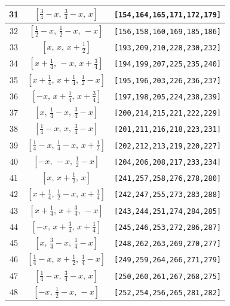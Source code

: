 \documentclass[fleqn,8pt]{jsarticle}
\begin{document}
\begin{longtable}{ccc}
31 & $\left[ \frac{3}{4} - x,\, \frac{3}{4} - x,\, x \right]$ & {\tt [154,164,165,171,172,179]} \\ \hline
32 & $\left[ \frac{1}{2} - x,\, \frac{1}{2} - x,\, - x \right]$ & {\tt [156,158,160,169,185,186]} \\ \hline
33 & $\left[ x,\, x,\, x + \frac{1}{2} \right]$ & {\tt [193,209,210,228,230,232]} \\ \hline
34 & $\left[ x + \frac{1}{4},\, - x,\, x + \frac{3}{4} \right]$ & {\tt [194,199,207,225,235,240]} \\ \hline
35 & $\left[ x + \frac{1}{4},\, x + \frac{1}{4},\, \frac{1}{2} - x \right]$ & {\tt [195,196,203,226,236,237]} \\ \hline
36 & $\left[ - x,\, x + \frac{1}{4},\, x + \frac{3}{4} \right]$ & {\tt [197,198,205,224,238,239]} \\ \hline
37 & $\left[ x,\, \frac{1}{4} - x,\, \frac{3}{4} - x \right]$ & {\tt [200,214,215,221,222,229]} \\ \hline
38 & $\left[ \frac{1}{4} - x,\, x,\, \frac{3}{4} - x \right]$ & {\tt [201,211,216,218,223,231]} \\ \hline
39 & $\left[ \frac{1}{4} - x,\, \frac{1}{4} - x,\, x + \frac{1}{2} \right]$ & {\tt [202,212,213,219,220,227]} \\ \hline
40 & $\left[ - x,\, - x,\, \frac{1}{2} - x \right]$ & {\tt [204,206,208,217,233,234]} \\ \hline
41 & $\left[ x,\, x + \frac{1}{2},\, x \right]$ & {\tt [241,257,258,276,278,280]} \\ \hline
42 & $\left[ x + \frac{1}{4},\, \frac{1}{2} - x,\, x + \frac{1}{4} \right]$ & {\tt [242,247,255,273,283,288]} \\ \hline
43 & $\left[ x + \frac{1}{4},\, x + \frac{3}{4},\, - x \right]$ & {\tt [243,244,251,274,284,285]} \\ \hline
44 & $\left[ - x,\, x + \frac{3}{4},\, x + \frac{1}{4} \right]$ & {\tt [245,246,253,272,286,287]} \\ \hline
45 & $\left[ x,\, \frac{3}{4} - x,\, \frac{1}{4} - x \right]$ & {\tt [248,262,263,269,270,277]} \\ \hline
46 & $\left[ \frac{1}{4} - x,\, x + \frac{1}{2},\, \frac{1}{4} - x \right]$ & {\tt [249,259,264,266,271,279]} \\ \hline
47 & $\left[ \frac{1}{4} - x,\, \frac{3}{4} - x,\, x \right]$ & {\tt [250,260,261,267,268,275]} \\ \hline
48 & $\left[ - x,\, \frac{1}{2} - x,\, - x \right]$ & {\tt [252,254,256,265,281,282]} \\ \hline

\end{longtable}
\end{document}
